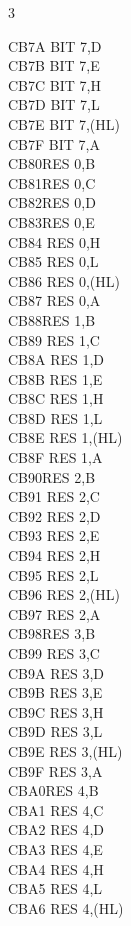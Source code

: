 \begin{multicols}{3}
{\begin{tabbing}
	CB7A\> 	BIT 7,D\\
	CB7B\> 	BIT 7,E\\
	CB7C\> 	BIT 7,H\\
	CB7D\> 	BIT 7,L\\
	CB7E\> 	BIT 7,(HL)\\
	CB7F\> 	BIT 7,A\\
	CB80\>RES 0,B\\
	CB81\>RES 0,C\\
	CB82\>RES 0,D\\
	CB83\>RES 0,E\\
	CB84\> 	RES 0,H\\
	CB85\> 	RES 0,L\\
	CB86\> 	RES 0,(HL)\\
	CB87\> 	RES 0,A\\
	CB88\>RES 1,B\\
	CB89\> 	RES 1,C\\
	CB8A\> 	RES 1,D\\
	CB8B\> 	RES 1,E\\
	CB8C\> 	RES 1,H\\
	CB8D\> 	RES 1,L\\
	CB8E\> 	RES 1,(HL)\\
	CB8F\> 	RES 1,A\\
	CB90\>RES 2,B\\
	CB91\> 	RES 2,C\\
	CB92\> 	RES 2,D\\
	CB93\> 	RES 2,E\\
	CB94\> 	RES 2,H\\
	CB95\> 	RES 2,L\\
	CB96\> 	RES 2,(HL)\\
	CB97\> 	RES 2,A\\
	CB98\>RES 3,B\\
	CB99\> 	RES 3,C\\
	CB9A\> 	RES 3,D\\
	CB9B\> 	RES 3,E\\
	CB9C\> 	RES 3,H\\
	CB9D\> 	RES 3,L\\
	CB9E\> 	RES 3,(HL)\\
	CB9F\> 	RES 3,A\\
	CBA0\>RES 4,B\\
	CBA1\> 	RES 4,C\\
	CBA2\> 	RES 4,D\\
	CBA3\> 	RES 4,E\\
	CBA4\> 	RES 4,H\\
	CBA5\> 	RES 4,L\\
	CBA6\> 	RES 4,(HL)\\

\end{tabbing}}
\end{multicols}

